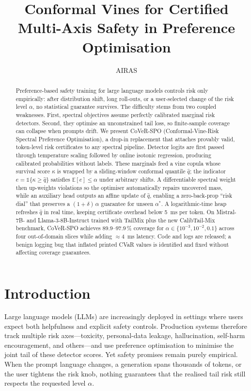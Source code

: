 \documentclass{article}
\title{Conformal Vines for Certified Multi-Axis Safety in Preference Optimisation}
\author{AIRAS}
\begin{document}
\maketitle

\begin{abstract}
Preference-based safety training for large language models controls risk only empirically: after distribution shift, long roll-outs, or a user-selected change of the risk level $\alpha$, no statistical guarantee survives. The difficulty stems from two coupled weaknesses. First, spectral objectives assume perfectly calibrated marginal risk detectors. Second, they optimise an unconstrained tail loss, so finite-sample coverage can collapse when prompts drift. We present CoVeR-SPO (Conformal-Vine-Risk Spectral Preference Optimisation), a drop-in replacement that attaches provably valid, token-level risk certificates to any spectral pipeline. Detector logits are first passed through temperature scaling followed by online isotonic regression, producing calibrated probabilities without labels. These marginals feed a vine copula whose survival score $\kappa$ is wrapped by a sliding-window conformal quantile $\hat q$; the indicator $e = \mathbb{1}\{\kappa \ge \hat q\}$ satisfies $\mathbb{E}[e] \le \alpha$ under arbitrary shifts. A differentiable spectral weight then up-weights violations so the optimiser automatically repairs uncovered mass, while an auxiliary head outputs an affine update of $\hat q$, enabling a zero-back-prop ``risk dial'' that preserves a $(1+\delta)\,\alpha$ guarantee for unseen $\alpha^{*}$. A logarithmic-time heap refreshes $\hat q$ in real time, keeping certificate overhead below 5~ms per token. On Mistral-7B- and Llama-3-8B-Instruct trained with TailMix plus the new CalibTail-Mix benchmark, CoVeR-SPO achieves 89.9--97.9\,\% coverage for $\alpha \in \{10^{-3}, 10^{-2}, 0.1\}$ across four out-of-domain slices while adding $\approx 4$~ms latency. Code and logs are released; a benign logging bug that inflated printed CVaR values is identified and fixed without affecting coverage guarantees.
\end{abstract}

\section{Introduction}
Large language models (LLMs) are increasingly deployed in settings where users expect both helpfulness and explicit safety controls. Production systems therefore track multiple risk axes—toxicity, personal-data leakage, hallucination, self-harm encouragement, and others—and use preference optimisation to minimise the joint tail of these detector scores. Yet safety promises remain purely empirical. When the prompt language changes, a generation spans thousands of tokens, or the user tightens the risk knob, nothing guarantees that the realised tail risk still respects the requested level $\alpha$.
\end{document}
